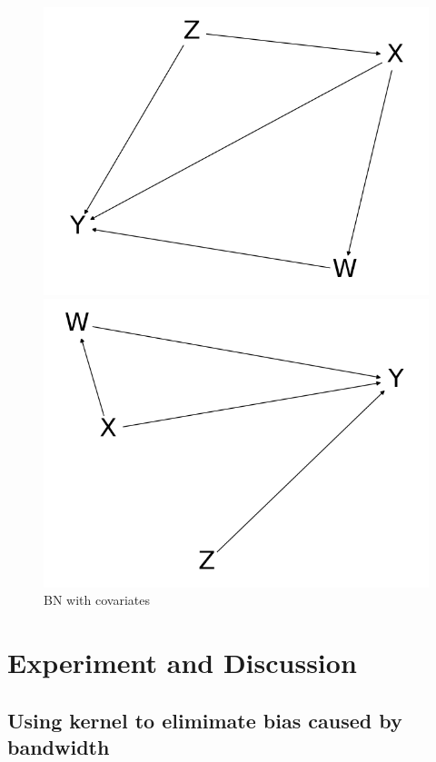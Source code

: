 \documentclass[a4 paper,12pt]{article}
\begin{document}
\begin{figure}[h]
	\centering
	\includegraphics[scale=0.5]{Figure_3.png}
   \caption{BN with covariates}
   \label{bn_with_covar}
	\includegraphics[scale=0.5]{Figure_4.png}
\end{figure}

\section{Experiment and Discussion}

\subsection{Using kernel to elimimate bias caused by bandwidth}
\end{document}
